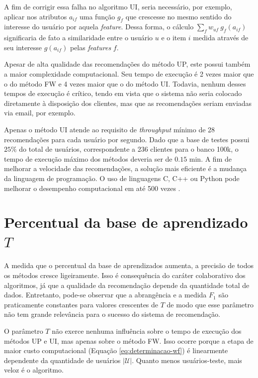 A fim de corrigir essa falha no algoritmo UI, seria necessário, por exemplo, aplicar nos atributos $a_{if}$ uma função $g_f$ que crescesse no mesmo sentido do interesse do usuário por aquela \textit{feature}. Dessa forma, o cálculo $\sum_f w_{uf}~g_f\left(a_{if}\right)$ significaria de fato a similaridade entre o usuário $u$ e o item $i$ medida através de seu interesse $g\left(a_{if}\right)$ pelas \textit{features} $f$.

Apesar de alta qualidade das recomendações do método UP, este possui também a maior complexidade computacional. Seu tempo de execução é 2 vezes maior que o do método FW e 4 vezes maior que o do método UI. Todavia, nenhum desses tempos de execução é crítico, tendo em vista que o sistema não seria colocado diretamente à disposição dos clientes, mas que as recomendações seriam enviadas via email, por exemplo. 

Apenas o método UI atende ao requisito de \textit{throughput} mínimo de 28 recomendações para cada usuário por segundo. Dado que a base de testes possui $25\%$ do total de usuários, correspondente a 236 clientes para o banco 100k, o tempo de execução máximo dos métodos deveria ser de $0.15$ min. A fim de melhorar a velocidade das recomendações, a solução mais eficiente é a mudança da linguagem de programação. O uso de linguagens C, C++ ou Python pode melhorar o desempenho computacional em até 500 vezes \cite{benchmarkingR}. 

\section{Percentual da base de aprendizado $T$} %
\label{sec:percentual_da_base_de_aprendizado_}

A medida que o percentual da base de aprendizados aumenta, a precisão de todos os métodos cresce ligeiramente. Isso é consequência do caráter colaborativo dos algoritmos, já que a qualidade da recomendação depende da quantidade total de dados. Entretanto, pode-se observar que a abrangência e a medida $F_1$ são praticamente constantes para valores crescentes de $T$ de modo que esse parâmetro não tem grande relevância para o sucesso do sistema de recomendação.

O parâmetro $T$ não exerce nenhuma influência sobre o tempo de execução dos métodos UP e UI, mas apenas sobre o método FW. Isso ocorre porque a etapa de maior custo computacional (Equação \ref{eq:determinacao-wf}) é linearmente dependente da quantidade de usuários $\left|\mathcal{U}\right|$. Quanto menos usuários-teste, mais veloz é o algoritmo.


